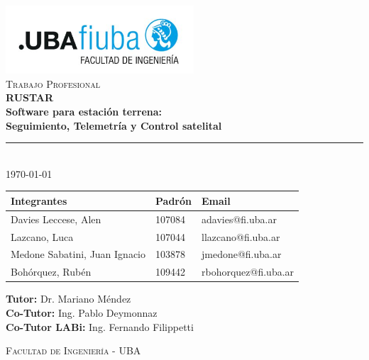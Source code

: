 \begin{titlepage}
\begin{center}

\includegraphics[width=7cm]{./images/fiuba_logo.jpg} \\[2cm]

\textsc{\Large Trabajo Profesional} \\[0.5cm]
{\huge \bfseries RUSTAR \\
Software para estación terrena: \\
Seguimiento, Telemetría  y Control satelital} \\[1cm]

\rule{\linewidth}{0.4pt} \\[1cm]

{\large \today} \\[2cm]

\hspace*{-1.5cm}
\begin{tabular}{ | l | l | l | }
    \hline
    \textbf{Integrantes} & \textbf{Padrón} & \textbf{Email} \\ \hline
    Davies Leccese, Alen & 107084 & adavies@fi.uba.ar \\ \hline
    Lazcano, Luca & 107044 & llazcano@fi.uba.ar \\ \hline
    Medone Sabatini, Juan Ignacio & 103878 & jmedone@fi.uba.ar \\ \hline
    Bohórquez, Rubén & 109442 & rbohorquez@fi.uba.ar \\ \hline
\end{tabular}

\vspace{1cm}

\textbf{Tutor:} Dr. Mariano Méndez\\[0.2cm]
\textbf{Co-Tutor:} Ing. Pablo Deymonnaz\\[0.2cm]
\textbf{Co-Tutor LABi:} Ing. Fernando Filippetti

\vfill

\textsc{Facultad de Ingeniería - UBA}

\end{center}
\end{titlepage}